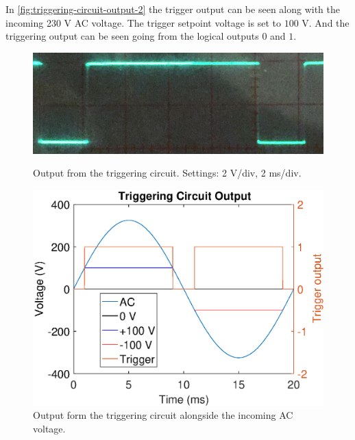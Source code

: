 	In \autoref{fig:triggering-circuit-output-2} the trigger output can be seen along with the incoming 230 V AC voltage.
	The trigger setpoint voltage is set to $100$ V.
	And the triggering output can be seen going from the logical outputs $0$ and $1$.



	\begin{figure}[!tbp]
	  \centering
	  \begin{minipage}[b]{0.39\textwidth}
	    \includegraphics[width=\textwidth]{chapters/hardware-chapters/triggering-circuit-output-cropped.png}
		\caption{Output from the triggering circuit. Settings: 2 V/div, 2 ms/div.}
		\label{fig:triggering-circuit-output}
	  \end{minipage}
	  \hfill
	  \begin{minipage}[b]{0.49\textwidth}
	    \includegraphics[width=\textwidth]{chapters/hardware-chapters/ac-wave-triggering.eps}
		\caption{Output form the triggering circuit alongside the incoming AC voltage.}
		\label{fig:triggering-circuit-output-2}
	  \end{minipage}
	\end{figure}
	



